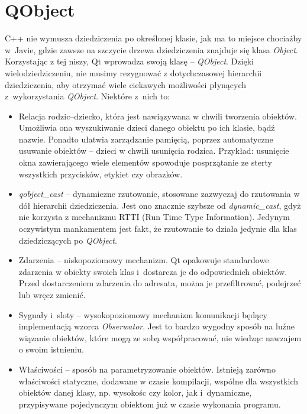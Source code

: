 \section{QObject}
C++ nie wymusza dziedziczenia po określonej klasie, jak ma to miejsce chociażby w~Javie, gdzie zawsze na szczycie drzewa dziedziczenia znajduje się klasa \textit{Object}. Korzystając z tej niszy, Qt wprowadza swoją klasę -- \textit{QObject}. Dzięki wielodziedziczeniu, nie musimy rezygnować z dotychczasowej hierarchii dziedziczenia, aby otrzymać wiele ciekawych możliwości płynących z~wykorzystania \textit{QObject}.
Niektóre z~nich to:
\begin{itemize}
\item Relacja rodzic--dziecko, która jest nawiązywana w chwili tworzenia obiektów. Umożliwia ona wyszukiwanie dzieci danego obiektu po ich klasie, bądź nazwie. Ponadto ułatwia zarządzanie pamięcią, poprzez automatyczne usuwanie obiektów -- dzieci w chwili usunięcia rodzica. Przykład: usunięcie okna zawierającego wiele elementów spowoduje posprzątanie ze sterty wszystkich przycisków, etykiet czy obrazków.
\item \textit{qobject\_cast} -- dynamiczne rzutowanie, stosowane zazwyczaj do rzutowania w dół hierarchii dziedziczenia. Jest ono znacznie szybsze od \textit{dynamic\_cast}, gdyż nie korzysta z mechanizmu RTTI (Run Time Type Information). Jedynym oczywistym mankamentem jest fakt, że rzutowanie to działa jedynie dla klas dziedziczących po \textit{QObject}.
\item Zdarzenia -- niskopoziomowy mechanizm. Qt opakowuje standardowe zdarzenia w obiekty swoich klas i~dostarcza je do odpowiednich obiektów. Przed dostarczeniem zdarzenia do adresata, można je przefiltrować, podejrzeć lub wręcz zmienić.
\item Sygnały i~sloty -- wysokopoziomowy mechanizm komunikacji będący implementacją wzorca \textit{Obserwator}.
Jest to bardzo wygodny sposób na luźne wiązanie obiektów, które mogą ze sobą współpracować, nie wiedząc nawzajem o swoim istnieniu.
\item Właściwości -- sposób na parametryzowanie obiektów. Istnieją zarówno właściwości statyczne, dodawane w czasie kompilacji, wspólne dla wszystkich obiektów danej klasy, np. wysokośc czy kolor, jak i~dynamiczne, przypisywane pojedynczym obiektom już w czasie wykonania programu.
\end{itemize}

